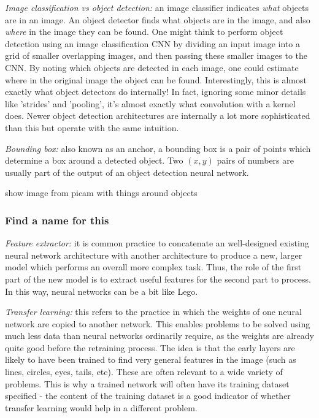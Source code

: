 \textit{Image classification vs object detection:} an image classifier indicates \emph{what} objects are in an image. An object detector finds what objects are in the image, and also \emph{where} in the image they can be found. One might think to perform object detection using an image classification CNN by dividing an input image into a grid of smaller overlapping images, and then passing these smaller images to the CNN. By noting which objects are detected in each image, one could estimate where in the original image the object can be found. Interestingly, this is almost exactly what object detectors do internally! In fact, ignoring some minor details like 'strides' and 'pooling', it's almost exactly what convolution with a kernel does. Newer object detection architectures are internally a lot more sophisticated than this but operate with the same intuition.

\textit{Bounding box:} also known as an anchor, a bounding box is a pair of points which determine a box around a detected object. Two $(x, y)$ pairs of numbers are usually part of the output of an object detection neural network.

{\Huge \color{red} show image from picam with things around objects}

\subsubsection{\color{red} Find a name for this}

\textit{Feature extractor:} it is common practice to concatenate an well-designed existing neural network architecture with another architecture to produce a new, larger model which performs an overall more complex task. Thus, the role of the first part of the new model is to extract useful features for the second part to process. In this way, neural networks can be a bit like Lego.

\textit{Transfer learning:} this refers to the practice in which the weights of one neural network are copied to another network. This enables problems to be solved using much less data than neural networks ordinarily require, as the weights are already quite good before the retraining process. The idea is that the early layers are likely to have been trained to find very general features in the image (such as lines, circles, eyes, tails, etc). These are often relevant to a wide variety of problems. This is why a trained network will often have its training dataset specified - the content of the training dataset is a good indicator of whether transfer learning would help in a different problem.

